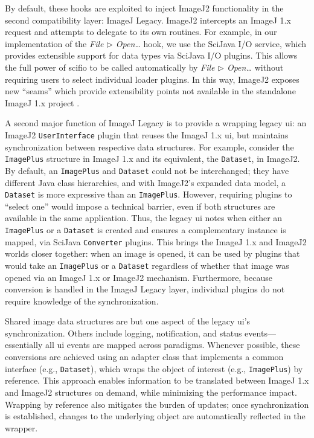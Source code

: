 \documentclass{bmcart}
\begin{document}
By default, these hooks are exploited to inject ImageJ2 functionality in the
second compatibility layer: ImageJ Legacy. ImageJ2 intercepts an ImageJ 1.x
request and attempts to delegate to its own routines. For example, in our
implementation of the \textit{File $\triangleright$ Open\ldots} hook, we use
the SciJava I/O service, which provides extensible support for data types via
SciJava I/O plugins. This allows the full power of \acrshort{scifio} to be
called automatically by \textit{File $\triangleright$ Open\ldots} without
requiring users to select individual loader plugins. In this way, ImageJ2
exposes new ``seams'' which provide extensibility points not available in the
standalone ImageJ 1.x project \cite{legacy_code}.

A second major function of ImageJ Legacy is to provide a wrapping legacy
\acrshort{ui}: an ImageJ2 \texttt{UserInterface} plugin that reuses the ImageJ
1.x \acrshort{ui}, but maintains synchronization between respective data
structures. For example, consider the \texttt{ImagePlus} structure in ImageJ
1.x and its equivalent, the \texttt{Dataset}, in ImageJ2. By default, an
\texttt{ImagePlus} and \texttt{Dataset} could not be interchanged; they have
different Java class hierarchies, and with ImageJ2's expanded data model, a
\texttt{Dataset} is more expressive than an \texttt{ImagePlus}. However,
requiring plugins to ``select one'' would impose a technical barrier, even if
both structures are available in the same application. Thus, the legacy
\acrshort{ui} notes when either an \texttt{ImagePlus} or a \texttt{Dataset} is
created and ensures a complementary instance is mapped, via SciJava
\texttt{Converter} plugins. This brings the ImageJ 1.x and ImageJ2 worlds
closer together: when an image is opened, it can be used by plugins that would
take an \texttt{ImagePlus} or a \texttt{Dataset} regardless of whether that
image was opened via an ImageJ 1.x or ImageJ2 mechanism. Furthermore, because
conversion is handled in the ImageJ Legacy layer, individual plugins do not
require knowledge of the synchronization.

Shared image data structures are but one aspect of the legacy \acrshort{ui}'s
synchronization. Others include logging, notification, and status
events---essentially all \acrshort{ui} events are mapped across paradigms.
Whenever possible, these conversions are achieved using an adapter class that
implements a common interface (e.g., \texttt{Dataset}), which wraps the object
of interest (e.g., \texttt{ImagePlus}) by reference. This approach enables
information to be translated between ImageJ 1.x and ImageJ2 structures on
demand, while minimizing the performance impact. Wrapping by reference also
mitigates the burden of updates; once synchronization is established, changes
to the underlying object are automatically reflected in the wrapper.
\end{document}
